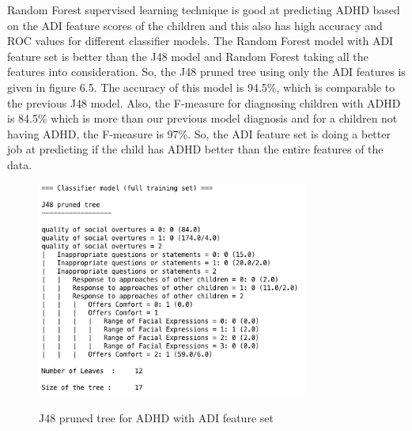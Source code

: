 Random Forest supervised learning technique is good at predicting ADHD based on the ADI feature scores of the children and this also has high accuracy and ROC values for different classifier models. The Random Forest model with ADI feature set is better than the J48 model and Random Forest taking all the features into consideration. So, the J48 pruned tree using only the ADI features is given in figure 6.5. The accuracy of this model is 94.5\%, which is comparable to the previous J48 model. Also, the F-measure for diagnosing children with ADHD is 84.5\% which is more than our previous model diagnosis and for a children not having ADHD, the F-measure is 97\%. So, the ADI feature set is doing a better job at predicting if the child has ADHD better than the entire features of the data.
\begin{figure}
\centering
  {\includegraphics[width=0.8\textwidth]{Figures/Figure_6_5.png}}
  \caption{ J48 pruned tree for ADHD with ADI feature set}
  \label{fig:65}
\end{figure}

